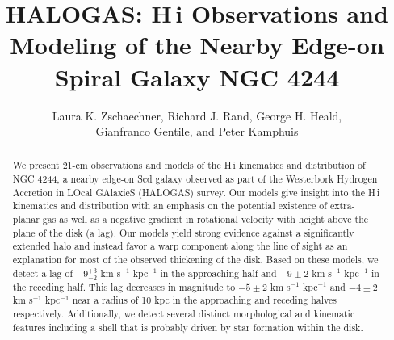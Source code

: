 \documentclass{emulateapj}
\begin{document}
\title{HALOGAS: {\sc H\,i} Observations and Modeling of the Nearby Edge-on Spiral Galaxy NGC 4244} 
\author{{\sc Laura K. Zschaechner, Richard J. Rand, George H. Heald,\\ Gianfranco Gentile, and Peter Kamphuis}}

\begin{abstract}

\par
     We present 21-cm observations and models of the {\sc H\,i} kinematics and distribution of NGC 4244, a nearby edge-on Scd galaxy observed as part of the Westerbork Hydrogen Accretion in LOcal GAlaxieS (HALOGAS) survey. Our models give insight into the {\sc H\,i} kinematics and distribution with an emphasis on the potential existence of extra-planar gas as well as a negative gradient in rotational velocity with height above the plane of the disk (a lag).  Our models yield strong evidence against a significantly extended halo and instead favor a warp component along the line of sight as an explanation for most of the observed thickening of the disk.  Based on these models, we detect a lag of $-9^{+3}_{-2}$ km s$^{-1}$ kpc$^{-1}$ in the approaching half and $-9\pm$2 km s$^{-1}$ kpc$^{-1}$ in the receding half. This lag decreases in magnitude to $-5\pm$2 km s$^{-1}$ kpc$^{-1}$ and $-4\pm$2 km s$^{-1}$ kpc$^{-1}$ near a radius of 10 kpc in the approaching and receding halves respectively.  Additionally, we detect several distinct morphological and kinematic features including a shell that is probably driven by star formation within the disk.
\end{abstract}


\end{document}
